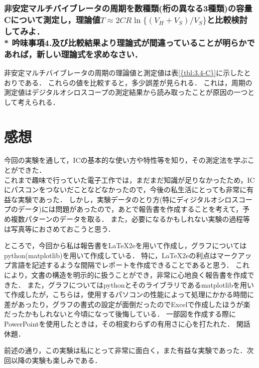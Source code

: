\documentclass[10pt, a4j, dvipdfmx]{jarticle}
\begin{document}
\subsubsection{非安定マルチバイブレータの周期を数種類(桁の異なる3種類)の容量Cについて測定し，理論値$T \approx 2CR\ln\{(V_H+V_S)/V_S\}$と比較検討してみよ．\\*	吟味事項4.及び比較結果より理論式が間違っていることが明らかであれば，新しい理論式を求めなさい．}
非安定マルチバイブレータの周期の理論値と測定値は表\ref{{tbl:3.4-C}}に示したとおりである．
これらの値を比較すると，多少誤差が見られる．
これは，周期の測定値はデジタルオシロスコープの測定結果から読み取ったことが原因の一つとして考えられる．

\section{感想}
今回の実験を通して，ICの基本的な使い方や特性等を知り，その測定法を学ぶことができた．\\
これまで趣味で行っていた電子工作では，まだまだ知識が足りなかったため，ICにパスコンをつないだことなどなかったので，今後の私生活にとっても非常に有益な実験であった．
しかし，実験データのとり方(特にディジタルオシロスコープのデータ)には問題があったので，あとで報告書を作成することを考えて，予め複数パターンのデータを取る．
また，必要になるかもしれない実験の過程等は写真等におさめておこうと思う．

ところで，今回から私は報告書を\LaTeX2eを用いて作成し，グラフについてはpython(matplotlib)を用いて作成している．
特に，\LaTeX2eの利点はマークアップ言語を記述するような間隔でレポートを作成できることであると思う．
これにより，文書の構造を明示的に扱うことができ，非常に心地良く報告書を作成できた．
また，グラフについてはpythonとそのライブラリであるmatplotlibを用いて作成したが，こちらは，使用するパソコンの性能によって処理にかかる時間に差があったり，グラフの書式の設定が面倒だったのでExcelで作成したほうが楽だったかもしれないと今頃になって後悔している．
一部図を作成する際にPowerPointを使用したときは，その相変わらずの有用さに心を打たれた．
閑話休題．

前述の通り，この実験は私にとって非常に面白く，また有益な実験であった．次回以降の実験も楽しみである．
\end{document}
